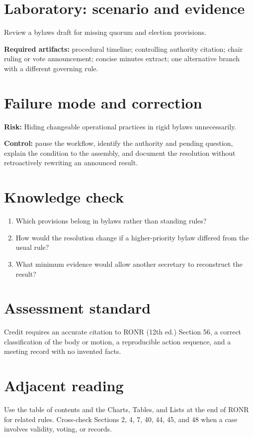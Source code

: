 \documentclass[11pt]{article}
\begin{document}
\section{Laboratory: scenario and evidence}
Review a bylaws draft for missing quorum and election provisions.

\textbf{Required artifacts:} procedural timeline; controlling authority citation; chair ruling or vote announcement; concise minutes extract; one alternative branch with a different governing rule.

\section{Failure mode and correction}
\textbf{Risk:} Hiding changeable operational practices in rigid bylaws unnecessarily.

\textbf{Control:} pause the workflow, identify the authority and pending question, explain the condition to the assembly, and document the resolution without retroactively rewriting an announced result.

\section{Knowledge check}
\begin{enumerate}[leftmargin=*,itemsep=4pt]
\item Which provisions belong in bylaws rather than standing rules?
\item How would the resolution change if a higher-priority bylaw differed from the usual rule?
\item What minimum evidence would allow another secretary to reconstruct the result?
\end{enumerate}

\section{Assessment standard}
Credit requires an accurate citation to RONR (12th ed.) Section 56, a correct classification of the body or motion, a reproducible action sequence, and a meeting record with no invented facts.

\section{Adjacent reading}
Use the table of contents and the Charts, Tables, and Lists at the end of RONR for related rules. Cross-check Sections 2, 4, 7, 40, 44, 45, and 48 when a case involves validity, voting, or records.
\end{document}
